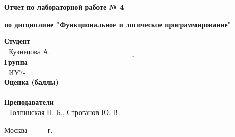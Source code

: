 \begin{titlepage}
	
	\begin{center}
		\Large\textbf{Отчет по лабораторной работе № 4}
		
		\Large\textbf {по дисциплине "Функциональное и логическое программирование"}
	\end{center}



	\noindent\newline\newline\newline
	

	\noindent\textbf{Студент} $\underline{\text{~~Кузнецова А. В.~~~~~~~~~~~~~~~~~~~~~~~~~~~~~~~~~~~~~~~~~~~~~~~~~~~~~~~~~~~~~~~~~~~~~~~~~~~~~~~~~~~~~~}}$\newline\newline
	\noindent\textbf{Группа} $\underline{\text{~~ИУ7-61Б~~~~~~~~~~~~~~~~~~~~~~~~~~~~~~~~~~~~~~~~~~~~~~~~~~~~~~~~~~~~~~~~~~~~~~~~~~~~~~~~~~~~~~~~~~~~~~~~~}}$\newline\newline
	\noindent\textbf{Оценка (баллы)} $\underline{\text{~~~~~~~~~~~~~~~~~~~~~~~~~~~~~~~~~~~~~~~~~~~~~~~~~~~~~~~~~~~~~~~~~~~~~~~~~~~~~~~~~~~~~~~~~~~~~~~~~~}}$\newline\newline
	\noindent\textbf{Преподаватели} $\underline{\text{~~Толпинская Н. Б., Строганов Ю. В.~~~~~~~~~~~~~~~~~~~~~~~~~~~~~~~~~~~~~~~~~~~~~~~~}}$\newline
	
	\begin{center}
		\vfill
		Москва~---~\the\year
		~г.
	\end{center}
	\restoregeometry
\end{titlepage}


